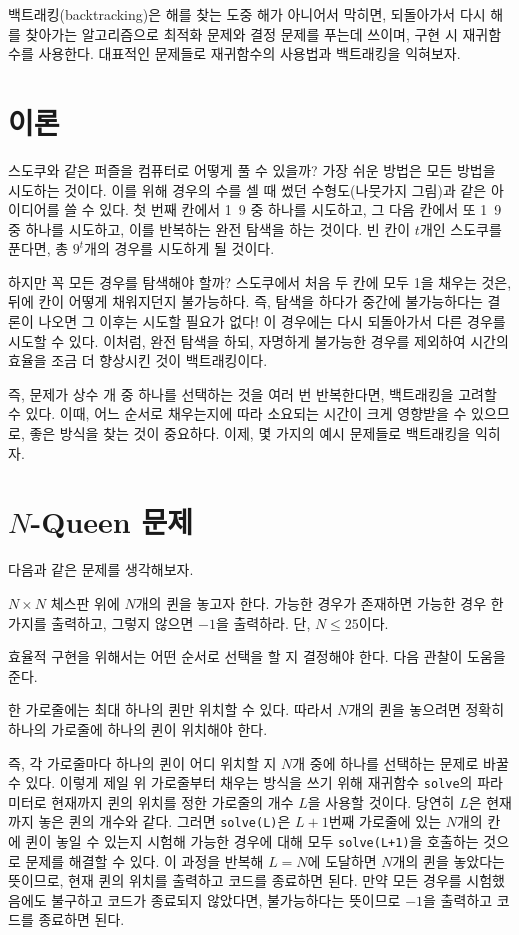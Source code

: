 백트래킹(backtracking)은 해를 찾는 도중 해가 아니어서 막히면, 되돌아가서 다시 해를 찾아가는 알고리즘으로 최적화 문제와 결정 문제를 푸는데 쓰이며, 구현 시 재귀함수를 사용한다. 대표적인 문제들로 재귀함수의 사용법과 백트래킹을 익혀보자.

\section{이론}
스도쿠와 같은 퍼즐을 컴퓨터로 어떻게 풀 수 있을까? 가장 쉬운 방법은 모든 방법을 시도하는 것이다. 이를 위해 경우의 수를 셀 때 썼던 수형도(나뭇가지 그림)과 같은 아이디어를 쓸 수 있다. 첫 번째 칸에서 1~9 중 하나를 시도하고, 그 다음 칸에서 또 1~9중 하나를 시도하고, 이를 반복하는 완전 탐색을 하는 것이다. 빈 칸이 $t$개인 스도쿠를 푼다면, 총 $9^t$개의 경우를 시도하게 될 것이다.

하지만 꼭 모든 경우를 탐색해야 할까? 스도쿠에서 처음 두 칸에 모두 1을 채우는 것은, 뒤에 칸이 어떻게 채워지던지 불가능하다. 즉, 탐색을 하다가 중간에 불가능하다는 결론이 나오면 그 이후는 시도할 필요가 없다! 이 경우에는 다시 되돌아가서 다른 경우를 시도할 수 있다. 이처럼, 완전 탐색을 하되, 자명하게 불가능한 경우를 제외하여 시간의 효율을 조금 더 향상시킨 것이 백트래킹이다.

즉, 문제가 상수 개 중 하나를 선택하는 것을 여러 번 반복한다면, 백트래킹을 고려할 수 있다. 이때, 어느 순서로 채우는지에 따라 소요되는 시간이 크게 영향받을 수 있으므로, 좋은 방식을 찾는 것이 중요하다. 이제, 몇 가지의 예시 문제들로 백트래킹을 익히자.

\section{$N$-Queen 문제}
다음과 같은 문제를 생각해보자.
\begin{example}\label{ex: n-queen}
    $N \times N$ 체스판 위에 $N$개의 퀸을 놓고자 한다. 가능한 경우가 존재하면 가능한 경우 한 가지를 출력하고, 그렇지 않으면 $-1$을 출력하라. 단, $N \leq 25$이다.
\end{example}
효율적 구현을 위해서는 어떤 순서로 선택을 할 지 결정해야 한다. 다음 관찰이 도움을 준다.

\begin{obs}
    한 가로줄에는 최대 하나의 퀸만 위치할 수 있다. 따라서 $N$개의 퀸을 놓으려면 정확히 하나의 가로줄에 하나의 퀸이 위치해야 한다.
\end{obs}

즉, 각 가로줄마다 하나의 퀸이 어디 위치할 지 $N$개 중에 하나를 선택하는 문제로 바꿀 수 있다. 이렇게 제일 위 가로줄부터 채우는 방식을 쓰기 위해 재귀함수 \texttt{solve}의 파라미터로 현재까지 퀸의 위치를 정한 가로줄의 개수 $L$을 사용할 것이다. 당연히 $L$은 현재까지 놓은 퀸의 개수와 같다. 그러면 \texttt{solve(L)}은 $L+1$번째 가로줄에 있는 $N$개의 칸에 퀸이 놓일 수 있는지 시험해 가능한 경우에 대해 모두 \texttt{solve(L+1)}을 호출하는 것으로 문제를 해결할 수 있다. 이 과정을 반복해 $L=N$에 도달하면 $N$개의 퀸을 놓았다는 뜻이므로, 현재 퀸의 위치를 출력하고 코드를 종료하면 된다. 만약 모든 경우를 시험했음에도 불구하고 코드가 종료되지 않았다면, 불가능하다는 뜻이므로 $-1$을 출력하고 코드를 종료하면 된다.

